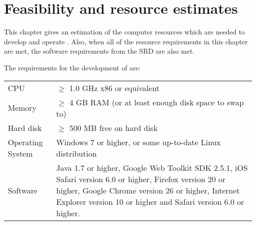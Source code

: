 \chapter{Feasibility and resource estimates}
\label{chap:feasresest}


This chapter gives an estimation of the computer resources which are needed to develop and operate \projectname{}. Also, when all of the resource requirements in this chapter are met, the software requirements  from the SRD \cite{srd} are also met.

\fpstartparagraph{} The requirements for the development of \projectname{} are:

\begin{center}
\begin{tabular}{p{} p{}}
CPU &  $\geq$ 1.0 GHz x86 or equivalent \\
Memory & $\geq$ 4 GB RAM (or at least enough disk space to swap to) \\
Hard disk & $\geq$ 500 MB free on hard disk \\
Operating System & Windows 7 or higher, or some up-to-date Linux distribution\\
Software & Java 1.7 or higher, Google Web Toolkit SDK 2.5.1, iOS Safari version 6.0 or higher, Firefox version 20 or higher, Google Chrome version 26 or higher, Internet Explorer version 10 or higher and Safari version 6.0 or higher. \\
\end{tabular}
\end{center}

